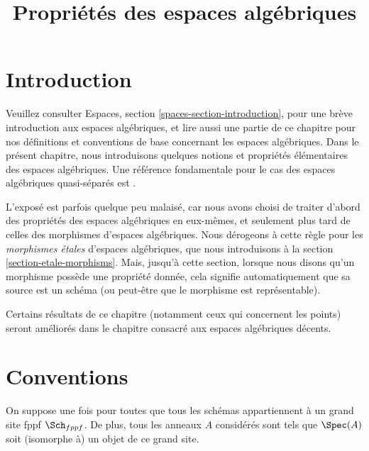 

%


\title{Propriétés des espaces algébriques}


\maketitle

\label{section-phantom}

\tableofcontents

\section{Introduction}
\label{section-introduction}

\noindent
Veuillez consulter
Espaces, section \ref{spaces-section-introduction},
pour une brève introduction aux espaces algébriques, et lire aussi
une partie de ce chapitre pour nos définitions et conventions de base
concernant les espaces algébriques. Dans le présent chapitre, nous introduisons
quelques notions et propriétés élémentaires des espaces algébriques. Une référence
fondamentale pour le cas des espaces algébriques quasi-séparés est
\cite{Kn}.

\medskip\noindent
L'exposé est parfois quelque peu malaisé, car nous avons choisi
de traiter d'abord des propriétés des espaces algébriques
en eux-mêmes, et seulement plus tard de celles des morphismes d'espaces
algébriques. Nous dérogeons à cette règle pour les
{\it morphismes étales} d'espaces algébriques, que nous introduisons à la
section \ref{section-etale-morphisms}.
Mais, jusqu'à cette section, lorsque nous disons qu'un morphisme possède une propriété donnée,
cela signifie automatiquement que sa source est un schéma (ou peut-être que
le morphisme est représentable).

\medskip\noindent
Certains résultats de ce chapitre (notamment ceux qui concernent les points)
seront améliorés dans le chapitre consacré aux espaces algébriques décents.


\section{Conventions}
\label{section-conventions}

\noindent
On suppose une fois pour toutes que tous les schémas appartiennent à
un grand site fppf $\Sch_{fppf}$. De plus, tous les anneaux $A$ considérés
sont tels que $\Spec(A)$ soit (isomorphe à) un
objet de ce grand site.

